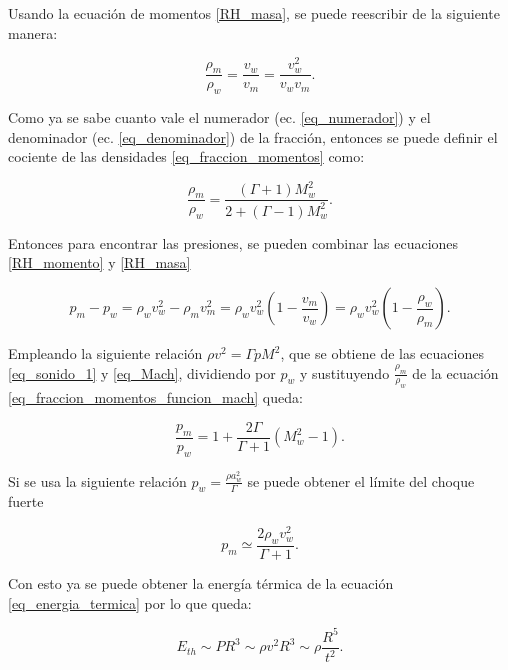 \documentclass[12pt,a4paper]{book}
\begin{document}
\noindent Usando la ecuación de momentos \ref{RH_masa}, se puede reescribir de la siguiente manera:

\begin{equation} \label{eq_fraccion_momentos}
  \frac{\rho_m }{\rho_w} = \frac{ v_w}{v_m} = \frac{v_w^2}{v_w v_m}.
\end{equation}

Como ya se sabe cuanto vale el numerador (ec. \ref{eq_numerador}) y el denominador (ec. \ref{eq_denominador})
de la fracción, entonces se puede definir el cociente de las densidades \ref{eq_fraccion_momentos} como:

\begin{equation}\label{eq_fraccion_momentos_funcion_mach}
  \frac{\rho_m}{\rho_w} = \frac{\left( \Gamma +1 \right) M_w^2}{2+ \left( \Gamma -1 \right) M_w^2}.
\end{equation}

\noindent Entonces para encontrar las presiones, se pueden combinar las ecuaciones \ref{RH_momento} y \ref{RH_masa} 

\begin{equation}
  p_m - p_w = \rho_w v_w^2 - \rho_m v_m^2 = \rho_w v_w^2 \left( 1 - \frac{v_m}{v_w}\right) = \rho_w v_w^2 \left( 1 - \frac{\rho_w}{\rho_m}\right).
\end{equation}

\noindent Empleando la siguiente relación $\rho v^2 = \Gamma p M^2$, que se obtiene de las ecuaciones \ref{eq_sonido_1} y
\ref{eq_Mach}, dividiendo por $p_w$ y sustituyendo  $\frac{\rho_m}{\rho_w}$ de la ecuación 
\ref{eq_fraccion_momentos_funcion_mach} queda:

\begin{equation} \label{eq_fraccion_Presiones}
  \frac{p_m}{p_w} = 1 + \frac{2 \Gamma}{\Gamma + 1} \left( M_w^2 -1\right).
\end{equation}

\noindent Si se usa la siguiente relación $ p_w = \frac{\rho a_w^2 }{\Gamma}$ se puede obtener el límite del choque fuerte

\begin{equation}
  p_m  \simeq \frac{2 \rho_w v_w^2}{\Gamma + 1}.
\end{equation}

\noindent Con esto ya se puede obtener la energía térmica de la ecuación \ref{eq_energia_termica} por lo que queda: 

\begin{equation}
  E_{th} \sim P R^3 \sim \rho v^2 R^3 \sim \rho \frac{R^5}{t^2}.
\end{equation}
\end{document}
